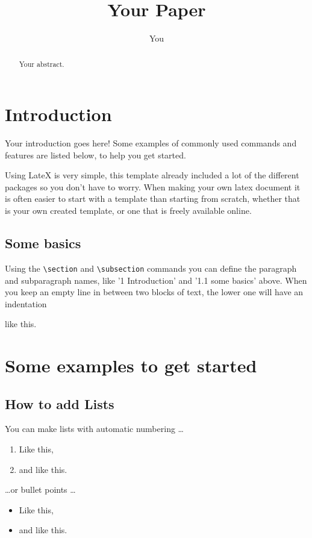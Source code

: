 \documentclass[12pt]{article}
\title{Your Paper}
\author{You}
\begin{document}
\maketitle

\begin{abstract}
Your abstract.
\end{abstract}

\section{Introduction}

Your introduction goes here! Some examples of commonly used commands and features are listed below, to help you get started.

Using LateX is very simple, this template already included a lot of the different packages so you don't have to worry. When making your own latex document it is often easier to start with a template than starting from scratch, whether that is your own created template, or one that is freely available online.

\subsection{Some basics}

Using the \verb=\section= and \verb=\subsection= commands you can define the paragraph and subparagraph names, like '1 Introduction' and '1.1 some basics' above. 
When you keep an empty line in between two blocks of text, the lower one will have an indentation

like this.

\section{Some examples to get started}

\subsection{How to add Lists}

You can make lists with automatic numbering \dots

\begin{enumerate}
\item Like this,
\item and like this.
\end{enumerate}
\dots or bullet points \dots
\begin{itemize}
\item Like this,
\item and like this.
\end{itemize}
\end{document}
